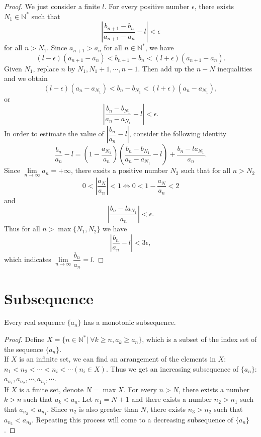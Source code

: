 \documentclass[11pt,fleqn]{book} %
\begin{document}
\begin{proof}
	We just consider a finite $l$. For every positive number $\epsilon$, there exists $N_1\in\mathbb{N^*}$ such that
	\[
	\left|\frac{b_{n+1}-b_n}{a_{n+1}-a_n}-l\right|<\epsilon
	\]
	for all $n>N_1$. Since $a_{n+1}>a_n$ for all $n\in\mathbb{N^*}$, we have
	\[
	(l-\epsilon)(a_{n+1}-a_{n})<b_{n+1}-b_{n}<(l+\epsilon)(a_{n+1}-a_{n}).
	\]
	Given $N_1$, replace $n$ by $N_1,N_1+1,\cdots,n-1$. Then add up the $n-N$ inequalities and we obtain
	\[
	(l-\epsilon)(a_n-a_{N_1})<b_n-b_{N_1}<(l+\epsilon)(a_n-a_{N_1}),
	\]
	or
	\[
	\left|\frac{b_n-b_{N_1}}{a_n-a_{N_1}}-l\right|<\epsilon.
	\]
	In order to estimate the value of $\left|\dfrac{b_n}{a_n}-l\right|$, consider the following identity
	\[
	\frac{b_n}{a_n}-l=\left(1-\frac{a_{N_1}}{a_n}\right)\left(\frac{b_n-b_{N_1}}{a_n-a_{N_1}}-l\right)+\frac{b_n-la_{N_1}}{a_n}.
	\]
	Since $\lim\limits_{n\to\infty}a_n=+\infty$, there exsits a positive number $N_2$ such that for all $n>N_2$
	\[
	0<\left|\frac{a_N}{a_n}\right|<1\Leftrightarrow0<1-\frac{a_N}{a_n}<2
	\]
	and
	\[
	\left|\frac{b_n-la_{N_1}}{a_n}\right|<\epsilon.
	\]
	Thus for all $n>\max\{N_1,N_2\}$ we have
	\[
	\left|\dfrac{b_n}{a_n}-l\right|<3\epsilon,
	\]
	which indicates $\lim\limits_{n\to\infty}\dfrac{b_n}{a_n}=l$.

\end{proof}




\section{Subsequence}

\begin{proposition}
    Every real sequence $\{a_n\}$ has a monotonic subsequence.
\end{proposition}

\begin{proof}
	Define $X=\{n\in \mathbb{N^*}| \;\forall k\ge n, a_k\ge a_n\}$, which is a subset of the index set of the sequence $\{a_n\}$.\\
	If $X$ is an infinite set, we can find an arrangement of the elements in $X$: $n_1<n_2<\cdots<n_i<\cdots(n_i\in X)$. Thus we get an increasing subsequence of $\{a_n\}$: $a_{n_1},a_{n_2},\cdots,a_{n_i},\cdots$.\\
	If $X$ is a finite set, denote $N=\max X$. For every $n>N$, there exists a number $k>n$ such that $a_k<a_n$. Let $n_1=N+1$ and there exists a number $n_2>n_1$ such that $a_{n_2}<a_{n_1}$. Since $n_2$ is also greater than $N$, there exists $n_3>n_2$ such that $a_{n_3}<a_{n_2}$. Repeating this process will come to a decreasing subsequence of $\{a_n\}$.
\end{proof}
\end{document}
